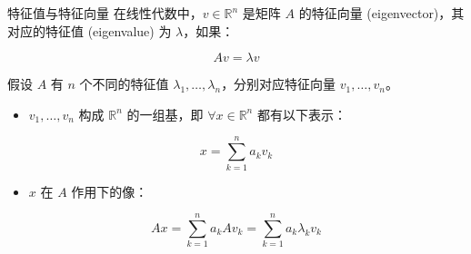 \documentclass[
  ignorenonframetext,
]{beamer}
\providecommand{\tightlist}{%
  \setlength{\itemsep}{0pt}\setlength{\parskip}{0pt}}
\begin{document}
\begin{frame}{特征值与特征向量}
\protect{}\label{ux7279ux5f81ux503cux4e0eux7279ux5f81ux5411ux91cf}
在线性代数中，\(v \in \mathbb{R}^{n}\) 是矩阵 \(A\) 的特征向量
(eigenvector)，其对应的特征值 (eigenvalue) 为 \(\lambda\)，如果：

\[
A v=\lambda v
\]

假设 \(A\) 有 \(n\) 个不同的特征值
\(\lambda_{1}, \ldots, \lambda_{n}\)，分别对应特征向量
\(v_{1}, \ldots, v_{n}\)。

\begin{itemize}
\tightlist
\item
  \(v_{1}, \ldots, v_{n}\) 构成 \(\mathbb{R}^{n}\) 的一组基，即
  \(\forall x \in \mathbb{R}^{n}\) 都有以下表示：
\end{itemize}

\[
x=\sum_{k=1}^{n} a_{k} v_{k}
\]

\begin{itemize}
\tightlist
\item
  \(x\) 在 \(A\) 作用下的像：
\end{itemize}

\[
A x=\sum_{k=1}^{n} a_{k} A v_{k}=\sum_{k=1}^{n} a_{k} \lambda_{k} v_{k}
\]
\end{frame}
\end{document}
